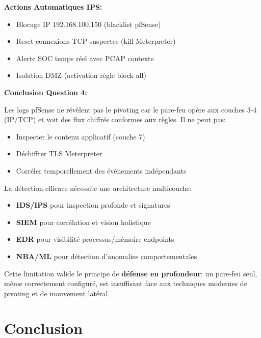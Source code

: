 \documentclass[12pt,a4paper,openany]{report}
\begin{document}
	\textbf{Actions Automatiques IPS:}
	\begin{itemize}
		\item Blocage IP 192.168.100.150 (blacklist pfSense)
		\item Reset connexions TCP suspectes (kill Meterpreter)
		\item Alerte SOC temps réel avec PCAP contexte
		\item Isolation DMZ (activation règle block all)
	\end{itemize}
	
	\textbf{Conclusion Question 4:}
	
	Les logs pfSense ne révèlent pas le pivoting car le pare-feu opère aux 
	couches 3-4 (IP/TCP) et voit des flux chiffrés conformes aux règles. 
	Il ne peut pas:
	\begin{itemize}
		\item Inspecter le contenu applicatif (couche 7)
		\item Déchiffrer TLS Meterpreter
		\item Corréler temporellement des événements indépendants
	\end{itemize}
	
	La détection efficace nécessite une architecture multicouche:
	\begin{itemize}
		\item \textbf{IDS/IPS} pour inspection profonde et signatures
		\item \textbf{SIEM} pour corrélation et vision holistique
		\item \textbf{EDR} pour visibilité processus/mémoire endpoints
		\item \textbf{NBA/ML} pour détection d'anomalies comportementales
	\end{itemize}
	
	Cette limitation valide le principe de \textbf{défense en profondeur}: 
	un pare-feu seul, même correctement configuré, est insuffisant face aux 
	techniques modernes de pivoting et de mouvement latéral.
	
	
	
	
	
	\chapter{Conclusion}
	
\end{document}
